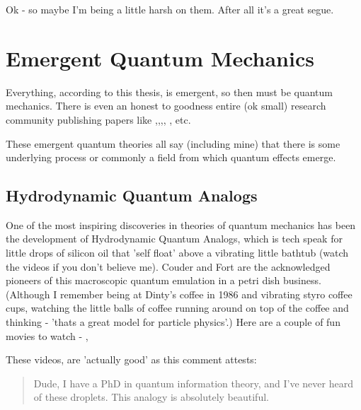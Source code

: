 \documentclass[../rzero]{subfiles}
\begin{document}
Ok - so maybe I'm being a little harsh on them. After all it's a great segue.   

\section{Emergent Quantum Mechanics}\label{emergentQMSection}
Everything, according to this thesis, is emergent, so then must be quantum mechanics. There is even an honest to goodness entire (ok small) research community publishing papers like \cite{tHooft2007},\cite{Grossing2012},\cite{acostaEMERGENTQUANTUMMECHANICS2012},\cite{Walleczek2019}, \cite{Durey2018}, \cite{Andersen2016} etc. 

These emergent quantum theories all say (including mine) that there is some underlying process or commonly a field from which quantum effects emerge.

\subsection{Hydrodynamic Quantum Analogs}
One of the most inspiring discoveries in theories of quantum mechanics has been the development of Hydrodynamic Quantum Analogs, which is tech speak for little drops of silicon oil that 'self float' above a vibrating little bathtub (watch the videos if you don't believe me). Couder and Fort \cite{eddiInformationStoredFaraday2011} are the acknowledged pioneers of this macroscopic quantum emulation in a petri dish business. (Although I remember being at Dinty's coffee in 1986 and vibrating styro coffee cups, watching the little balls of coffee running around on top of the coffee and thinking - 'thats a great model for particle physics'.) Here are a couple of fun movies to watch - \cite{americanphysicalsocietyFaradayInstabilityFloating2014}, \cite{veritasiumThisWhatQuantum2016} 

These videos, are 'actually good'\cite{theonionYouTubeContestChallenges2008} as this comment attests:
\begin{quotation}
	Dude, I have a PhD in quantum information theory, and I've never heard of these droplets. This analogy is absolutely beautiful. 
\end{quotation}
 
\end{document}
